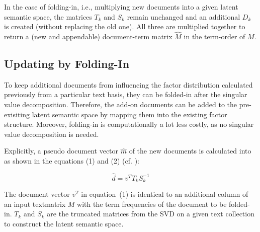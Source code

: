 \documentclass[article]{jss}
\begin{document}
In the case of folding-in, i.e., multiplying new documents into a given
latent semantic space, the matrices \begin{math}T_k\end{math} and \begin{math}S_k\end{math} 
remain unchanged and an additional \begin{math}D_k\end{math} is created (without replacing the old one).
All three are multiplied together to return a (new and appendable)
document-term matrix \begin{math}\hat{M}\end{math} in the term-order 
of \begin{math}M\end{math}.

\subsection{Updating by Folding-In}

To keep additional documents from influencing the factor distribution
calculated previously from a particular text basis, they can be folded-in 
after the singular value decomposition. Therefore, the add-on documents can be 
added to the pre-exisiting latent semantic space by mapping them into the 
existing factor structure. Moreover, folding-in
is computationally a lot less costly, as no singular value decomposition
is needed.

Explicitly, a pseudo document vector \begin{math}\hat{m}\end{math} of the new documents 
is calculated into as shown in the equations (1) and (2) (cf. \cite{berry:1995}):

\begin{equation}\hat{d} = v^{T} T_{k} S_{k}^{-1}\end{equation}

The document vector \begin{math}v^T\end{math} in equation~(1) is identical to an additional 
column of an input textmatrix \begin{math}M\end{math} with the term frequencies of the 
document to be folded-in. \begin{math}T_k\end{math} and \begin{math}S_k\end{math} are the truncated matrices 
from the SVD on a given text collection to construct the latent semantic space. 
\end{document}
